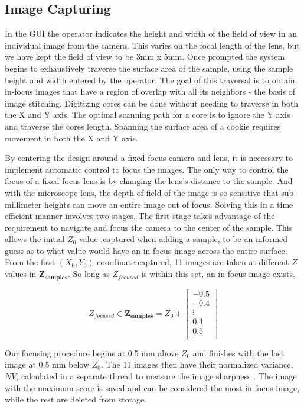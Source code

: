 \documentclass[a4paper,12pt]{article}
\begin{document}
\subsection{Image Capturing}
In the GUI the operator indicates the height and width of the field of view in an individual image from the camera. 
This varies on the focal length of the lens, but we have kept the field of view to be 3mm x 5mm. 
Once prompted the system begins to exhaustively traverse the surface area of the sample, using the sample height and width entered by the operator.  
The goal of this traversal is to obtain in-focus images that have a region of overlap with all its neighbors - the basis of image stitching. 
Digitizing cores can be done without needing to traverse in both the X and Y axis. 
The optimal scanning path for a core is to ignore the Y axis and traverse the cores length.
Spanning the surface area of a cookie requires movement in both the X and Y axis.

By centering the design around a fixed focus camera and lens, it is necessary to implement automatic control to focus the images. 
The only way to control the focus of a fixed focus lens is by changing the lens's distance to the sample. 
And with the microscope lens, the depth of field of the image is so sensitive that sub millimeter heights can move an entire image out of focus.
Solving this in a time efficient manner involves two stages. 
The first stage takes advantage of the requirement to navigate and focus the camera to the center of the sample.
This allows the initial $Z_0$ value ,captured when adding a sample, to be an informed guess as to what value would have an in focus image across the entire surface. 
From the first $(X_0, Y_0)$ coordinate captured, 11 images are taken at different $Z$ values in $\boldsymbol{Z_{\text{samples}}}$. 
So long as $Z_{focused}$ is within this set, an in focus image exists.

\[
Z_{focused} \in
\boldsymbol{Z_{\text{samples}}} = 
Z_0 + 
\begin{bmatrix}
-0.5 \\
-0.4 \\
\vdots \\
0.4 \\
0.5 \\
\end{bmatrix}
\] %

Our focusing procedure begins at 0.5 mm above $Z_0$ and finishes with the last image at 0.5 mm below $Z_0$.
The 11 images then have their normalized variance, $NV$, calculated in a separate thread to measure the image sharpness \citep{sampat_extensive_2014}.
The image with the maximum score is saved and can be considered the most in focus image, while the rest are deleted from storage.
\end{document}
